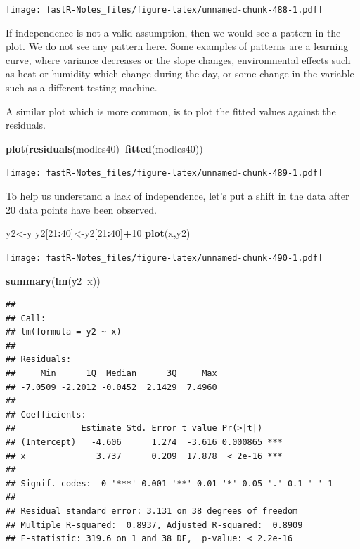 \documentclass[]{book}
\newenvironment{Shaded}{\begin{snugshade}}{\end{snugshade}}
\newcommand{\KeywordTok}[1]{\textcolor[rgb]{0.13,0.29,0.53}{\textbf{#1}}}
\newcommand{\DecValTok}[1]{\textcolor[rgb]{0.00,0.00,0.81}{#1}}
\newcommand{\OperatorTok}[1]{\textcolor[rgb]{0.81,0.36,0.00}{\textbf{#1}}}
\newcommand{\NormalTok}[1]{#1}
\theoremstyle{definition}
\theoremstyle{definition}
\theoremstyle{definition}
\theoremstyle{remark}
\begin{document}
\texttt{[image: fastR-Notes\_files/figure-latex/unnamed-chunk-488-1.pdf]}

If independence is not a valid assumption, then we would see a pattern
in the plot. We do not see any pattern here. Some examples of patterns
are a learning curve, where variance decreases or the slope changes,
environmental effects such as heat or humidity which change during the
day, or some change in the variable such as a different testing machine.

A similar plot which is more common, is to plot the fitted values
against the residuals.

\begin{Shaded}
\begin{Highlighting}[]
\KeywordTok{plot}\NormalTok{(}\KeywordTok{residuals}\NormalTok{(modles40)}\OperatorTok{~}\KeywordTok{fitted}\NormalTok{(modles40))}
\end{Highlighting}
\end{Shaded}

\texttt{[image: fastR-Notes\_files/figure-latex/unnamed-chunk-489-1.pdf]}

To help us understand a lack of independence, let's put a shift in the
data after 20 data points have been observed.

\begin{Shaded}
\begin{Highlighting}[]
\NormalTok{y2<-y}
\NormalTok{y2[}\DecValTok{21}\OperatorTok{:}\DecValTok{40}\NormalTok{]<-y2[}\DecValTok{21}\OperatorTok{:}\DecValTok{40}\NormalTok{]}\OperatorTok{+}\DecValTok{10}
\KeywordTok{plot}\NormalTok{(x,y2)}
\end{Highlighting}
\end{Shaded}

\texttt{[image: fastR-Notes\_files/figure-latex/unnamed-chunk-490-1.pdf]}

\begin{Shaded}
\begin{Highlighting}[]
\KeywordTok{summary}\NormalTok{(}\KeywordTok{lm}\NormalTok{(y2}\OperatorTok{~}\NormalTok{x))}
\end{Highlighting}
\end{Shaded}

\begin{verbatim}
## 
## Call:
## lm(formula = y2 ~ x)
## 
## Residuals:
##     Min      1Q  Median      3Q     Max 
## -7.0509 -2.2012 -0.0452  2.1429  7.4960 
## 
## Coefficients:
##             Estimate Std. Error t value Pr(>|t|)    
## (Intercept)   -4.606      1.274  -3.616 0.000865 ***
## x              3.737      0.209  17.878  < 2e-16 ***
## ---
## Signif. codes:  0 '***' 0.001 '**' 0.01 '*' 0.05 '.' 0.1 ' ' 1
## 
## Residual standard error: 3.131 on 38 degrees of freedom
## Multiple R-squared:  0.8937, Adjusted R-squared:  0.8909 
## F-statistic: 319.6 on 1 and 38 DF,  p-value: < 2.2e-16
\end{verbatim}
\end{document}

